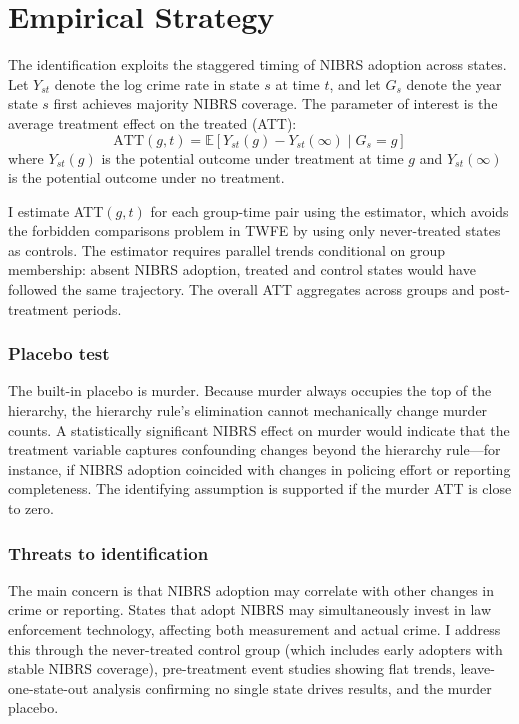 \documentclass[12pt]{article}
\newcommand{\E}{\mathbb{E}}
\begin{document}
\section{Empirical Strategy}

The identification exploits the staggered timing of NIBRS adoption across states. Let $Y_{st}$ denote the log crime rate in state $s$ at time $t$, and let $G_s$ denote the year state $s$ first achieves majority NIBRS coverage. The parameter of interest is the average treatment effect on the treated (ATT):
\begin{equation}
\text{ATT}(g,t) = \E[Y_{st}(g) - Y_{st}(\infty) \mid G_s = g]
\end{equation}
where $Y_{st}(g)$ is the potential outcome under treatment at time $g$ and $Y_{st}(\infty)$ is the potential outcome under no treatment.

I estimate ATT$(g,t)$ for each group-time pair using the \citet{callaway2021difference} estimator, which avoids the forbidden comparisons problem in TWFE by using only never-treated states as controls. The estimator requires parallel trends conditional on group membership: absent NIBRS adoption, treated and control states would have followed the same trajectory. The overall ATT aggregates across groups and post-treatment periods.

\subsubsection*{Placebo test} The built-in placebo is murder. Because murder always occupies the top of the hierarchy, the hierarchy rule's elimination cannot mechanically change murder counts. A statistically significant NIBRS effect on murder would indicate that the treatment variable captures confounding changes beyond the hierarchy rule---for instance, if NIBRS adoption coincided with changes in policing effort or reporting completeness. The identifying assumption is supported if the murder ATT is close to zero.

\subsubsection*{Threats to identification} The main concern is that NIBRS adoption may correlate with other changes in crime or reporting. States that adopt NIBRS may simultaneously invest in law enforcement technology, affecting both measurement and actual crime. I address this through the never-treated control group (which includes early adopters with stable NIBRS coverage), pre-treatment event studies showing flat trends, leave-one-state-out analysis confirming no single state drives results, and the murder placebo.
\end{document}
